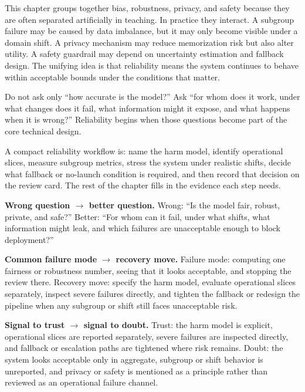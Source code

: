 This chapter groups together bias, robustness, privacy, and safety because they are often separated artificially in teaching. In practice they interact. A subgroup failure may be caused by data imbalance, but it may only become visible under a domain shift. A privacy mechanism may reduce memorization risk but also alter utility. A safety guardrail may depend on uncertainty estimation and fallback design. The unifying idea is that reliability means the system continues to behave within acceptable bounds under the conditions that matter.

\begin{decisionbox}
Do not ask only ``how accurate is the model?'' Ask ``for whom does it work, under what changes does it fail, what information might it expose, and what happens when it is wrong?'' Reliability begins when those questions become part of the core technical design.
\end{decisionbox}

\begin{practicalnote}
A compact reliability workflow is: name the harm model, identify operational slices, measure subgroup metrics, stress the system under realistic shifts, decide what fallback or no-launch condition is required, and then record that decision on the review card. The rest of the chapter fills in the evidence each step needs.
\end{practicalnote}

\begin{thinkingtool}
\textbf{Wrong question $\rightarrow$ better question.} Wrong: ``Is the model fair, robust, private, and safe?'' Better: ``For whom can it fail, under what shifts, what information might leak, and which failures are unacceptable enough to block deployment?''
\end{thinkingtool}

\begin{thinkingtool}
\textbf{Common failure mode $\rightarrow$ recovery move.} Failure mode: computing one fairness or robustness number, seeing that it looks acceptable, and stopping the review there. Recovery move: specify the harm model, evaluate operational slices separately, inspect severe failures directly, and tighten the fallback or redesign the pipeline when any subgroup or shift still faces unacceptable risk.
\end{thinkingtool}

\begin{thinkingtool}
\textbf{Signal to trust $\rightarrow$ signal to doubt.} Trust: the harm model is explicit, operational slices are reported separately, severe failures are inspected directly, and fallback or escalation paths are tightened where risk remains. Doubt: the system looks acceptable only in aggregate, subgroup or shift behavior is unreported, and privacy or safety is mentioned as a principle rather than reviewed as an operational failure channel.
\end{thinkingtool}

